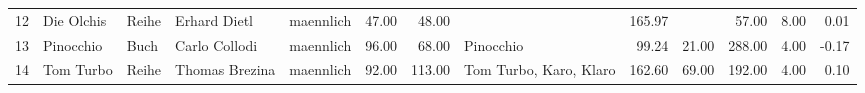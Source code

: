 \begin{sidewaystable}[ht]
\begin{center}
{\begin{tabular}{rllllrrlrrrrr}
  12 & Die Olchis                                                                                                                                                                                                                                                      & Reihe & Erhard Dietl                                                                                                                                                                                                                                                    & maennlich & 47.00 & 48.00 &                                                                                                                                                                                                                                                                 & 165.97 &  & 57.00 & 8.00 & 0.01 \\ 
  13 & Pinocchio                                                                                                                                                                                                                                                       & Buch & Carlo Collodi                                                                                                                                                                                                                                                   & maennlich & 96.00 & 68.00 & Pinocchio                                                                                                                                                                                                                                                       & 99.24 & 21.00 & 288.00 & 4.00 & -0.17 \\ 
  14 & Tom Turbo                                                                                                                                                                                                                                                       & Reihe & Thomas Brezina                                                                                                                                                                                                                                                  & maennlich & 92.00 & 113.00 & Tom Turbo, Karo, Klaro                                                                                                                                                                                                                                          & 162.60 & 69.00 & 192.00 & 4.00 & 0.10 \\ 

\end{tabular}}
\end{center}
\end{sidewaystable}
